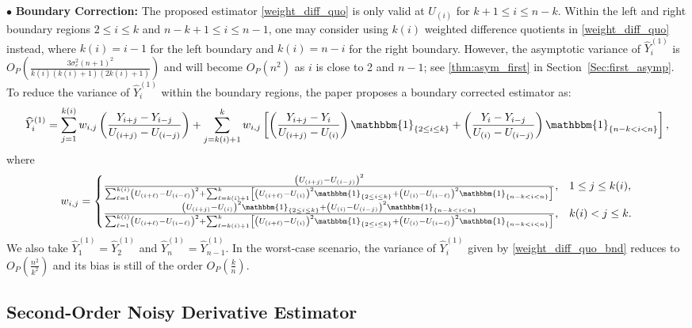 \documentclass{uwstat572}
\theoremstyle{definition}
\renewcommand{\hat}{\widehat}
\theoremstyle{theorem}
\begin{document}
$\bullet$ {\bf Boundary Correction:} The proposed estimator \eqref{weight_diff_quo} is only valid at $U_{(i)}$ for $k+1\leq i \leq n-k$. Within the left and right boundary regions $2\leq i \leq k$ and $n-k+1\leq i \leq n-1$, one may consider using $k(i)$ weighted difference quotients in \eqref{weight_diff_quo} instead, where $k(i)=i-1$ for the left boundary and $k(i)=n-i$ for the right boundary. However, the asymptotic variance of $\hat{Y}_i^{(1)}$ is $O_P\left(\frac{3\sigma_e^2 (n+1)^2}{k(i)(k(i)+1)(2k(i)+1)}\right)$ and will become $O_P(n^2)$ as $i$ is close to 2 and $n-1$; see \autoref{thm:asym_first} in Section~\ref{Sec:first_asymp}. To reduce the variance of $\hat{Y}_i^{(1)}$ within the boundary regions, the paper proposes a boundary corrected estimator as:
\begin{equation}
\label{weight_diff_quo_bnd}
\hat{Y}_i^{(1)} = \sum_{j=1}^{k(i)} w_{i,j} \left(\frac{Y_{i+j} - Y_{i-j}}{U_{(i+j)} - U_{(i-j)}}\right) + \sum_{j=k(i)+1}^k w_{i,j} \left[\left(\frac{Y_{i+j} - Y_i}{U_{(i+j)} - U_{(i)}}\right) \mathbbm{1}_{\{2\leq i\leq k\}} + \left(\frac{Y_i - Y_{i-j}}{U_{(i)} - U_{(i-j)}}\right) \mathbbm{1}_{\{n-k< i< n\}} \right],
\end{equation}
where 
\[
w_{i,j} = \begin{cases}
\frac{\left(U_{(i+j)} - U_{(i-j)}\right)^2}{\sum_{\ell=1}^{k(i)} \left(U_{(i+\ell)} - U_{(i-\ell)}\right)^2 + \sum_{\ell=k(i)+1}^k \left[\left(U_{(i+\ell)} - U_{(i)}\right)^2 \mathbbm{1}_{\{2\leq i\leq k\}} + \left(U_{(i)} - U_{(i-\ell)}\right)^2 \mathbbm{1}_{\{n-k< i< n\}} \right]}, & 1\leq j\leq k(i),\\
\frac{\left(U_{(i+j)} - U_{(i)}\right)^2 \mathbbm{1}_{\{2\leq i\leq k\}} + \left(U_{(i)} - U_{(i-j)}\right)^2 \mathbbm{1}_{\{n-k < i < n\}}}{\sum_{\ell=1}^{k(i)} \left(U_{(i+\ell)} - U_{(i-\ell)}\right)^2 + \sum_{\ell=k(i)+1}^k \left[\left(U_{(i+\ell)} - U_{(i)}\right)^2 \mathbbm{1}_{\{2\leq i\leq k\}} + \left(U_{(i)} - U_{(i-\ell)}\right)^2 \mathbbm{1}_{\{n-k< i< n\}} \right]}, & k(i)< j\leq k.
\end{cases}
\]
We also take $\hat{Y}_1^{(1)} = \hat{Y}_2^{(1)}$ and $\hat{Y}_n^{(1)} = \hat{Y}_{n-1}^{(1)}$. In the worst-case scenario, the variance of $\hat{Y}_i^{(1)}$ given by \eqref{weight_diff_quo_bnd} reduces to $O_P\left(\frac{n^2}{k^2}\right)$ and its bias is still of the order $O_P\left(\frac{k}{n}\right)$. 


\subsection{Second-Order Noisy Derivative Estimator}
\end{document}
